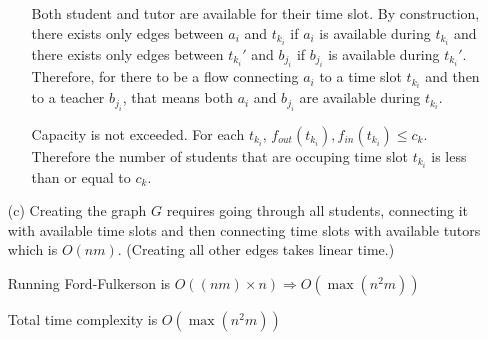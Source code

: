 \documentclass[12pt]{article}
\begin{document}
\begin{enumerate}
\begin{enumerate}
\item[] Both student and tutor are available for their time slot. By construction, there exists only edges between $a_i$ and $t_{k_i}$ if $a_i$ is available during $t_{k_i}$ and there exists only edges between $t_{k_i}'$ and $b_{j_i}$ if $b_{j_i}$ is available during $t_{k_i}'$. Therefore, for there to be a flow connecting $a_i$ to a time slot $t_{k_i}$ and then to a teacher $b_{j_i}$, that means both $a_i$ and $b_{j_i}$ are available during $t_{k_i}$.

\item[] Capacity is not exceeded. For each $t_{k_i}$, $f_{out}(t_{k_i}), f_{in}(t_{k_i})\leq c_k$. Therefore the number of students that are occuping time slot $t_{k_i}$ is less than or equal to $c_k$.
\end{enumerate}

\item[(c)] Creating the graph $G$ requires going through all students, connecting it with available time slots and then connecting time slots with available tutors which is $O(nm)$. (Creating all other edges takes linear time.)

Running Ford-Fulkerson is $O((nm) \times n) \Rightarrow O(\max(n^2m))$

Total time complexity is $O(\max(n^2m))$
\end{enumerate}
\end{document}
